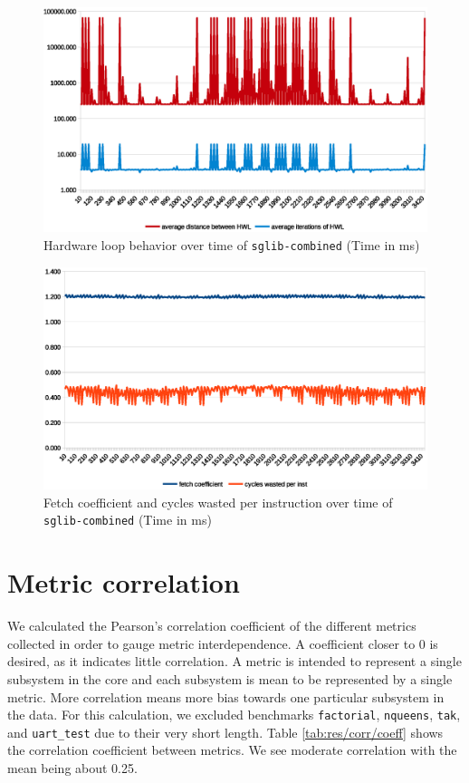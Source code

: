 \documentclass[../bachelor_paper.tex]{subfiles}
\begin{document}
\begin{figure}
    \centering
    \includegraphics[width=\textwidth]{img/graph/embench/sglib-combined_hwl.eps}
    \caption{Hardware loop behavior over time of \texttt{sglib-combined} (Time in ms)}
    \label{fig:res/sglib/hwl}
\end{figure}

\begin{figure}
    \centering
    \includegraphics[width=\textwidth]{img/graph/embench/sglib-combined_fetch_waste.eps}
    \caption{Fetch coefficient and cycles wasted per instruction over time of \texttt{sglib-combined} (Time in ms)}
    \label{fig:res/sglib/fetch_waste}
\end{figure}

\section{Metric correlation}
We calculated the Pearson's correlation coefficient of the different metrics collected in order to gauge metric interdependence. A coefficient closer to 0 is desired, as it indicates little correlation. A metric is intended to represent a single subsystem in the core and each subsystem is mean to be represented by a single metric. More correlation means more bias towards one particular subsystem in the data. For this calculation, we excluded benchmarks \texttt{factorial}, \texttt{nqueens}, \texttt{tak}, and \texttt{uart\_test} due to their very short length. Table \ref{tab:res/corr/coeff} shows the correlation coefficient between metrics. We see moderate correlation with the mean being about 0.25. 
\end{document}
